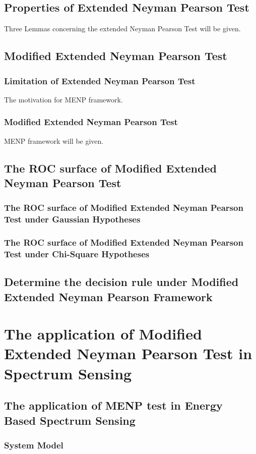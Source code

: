 \documentclass{report}
\begin{document}
\begin{spacing}{2.0}
\section{Properties of Extended Neyman Pearson Test}
Three Lemmas concerning the extended Neyman Pearson Test will be given.
\section{Modified Extended Neyman Pearson Test}
\subsection{Limitation of Extended Neyman Pearson Test}
The motivation for MENP framework.
\subsection{Modified Extended Neyman Pearson Test}
MENP framework will be given.
\section{The ROC surface of Modified Extended Neyman Pearson Test}
\subsection{The ROC surface of Modified Extended Neyman Pearson Test under Gaussian Hypotheses}
\subsection{The ROC surface of Modified Extended Neyman Pearson Test under Chi-Square Hypotheses}
\section{Determine the decision rule under Modified Extended Neyman Pearson Framework}

\chapter{The application of Modified Extended Neyman Pearson Test in Spectrum Sensing}
\section{The application of MENP test in Energy Based Spectrum Sensing}
\subsection{System Model}

\end{spacing}
\end{document}
